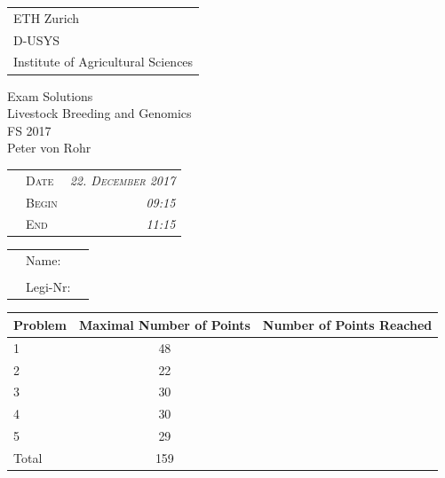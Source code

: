 \documentclass[]{article}
\title{}
\author{}
\date{}
\begin{document}
\thispagestyle{empty}

\begin{tabular}{l}
ETH Zurich \\
D-USYS\\
Institute of Agricultural Sciences\\
\end{tabular}

\vspace{15ex}

\begin{center}
\huge
Exam Solutions \\ \vspace{1ex}
Livestock Breeding and Genomics \\  \vspace{1ex}
FS 2017 \\

\normalsize
\vspace{7ex}
Peter von Rohr 
\end{center}

\vspace{7ex}

\begin{tabular}{p{5cm}lr}
  & \textsc{Date}  & \textsc{\emph{22. December 2017}} \\
  & \textsc{Begin} & \textsc{\emph{09:15 }}\\
  & \textsc{End}   & \textsc{\emph{11:15 }}\\ 
\end{tabular}

\vspace{5ex} \large

\begin{tabular}{p{2.5cm}p{3cm}p{6cm}}
  &  Name:     &  \\
  &            &  \\
  &  Legi-Nr:  & \\
\end{tabular}

\normalsize

\vspace{9ex}

\begin{center}
\begin{tabular}{|p{3cm}|c|c|}
\hline
Problem  &  Maximal Number of Points  &  Number of Points Reached \\
\hline
1        &  48         & \\
\hline
2        &  22         & \\
\hline
3        &  30         & \\
\hline
4        &  30          & \\
\hline
5        &  29          & \\
\hline
Total    &  159    & \\
\hline
\end{tabular}
\end{center}
\end{document}

